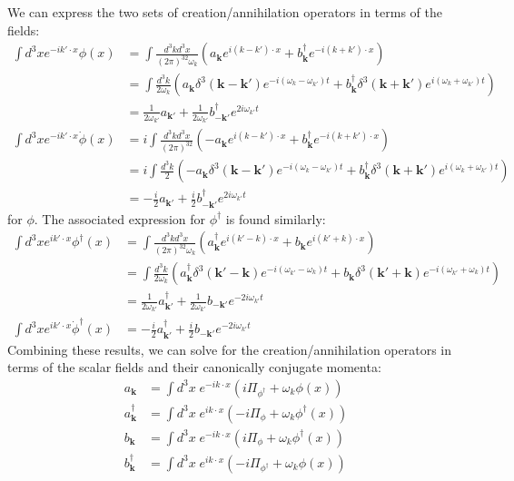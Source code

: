 \documentclass{mathnotes}
\begin{document}
We can express the two sets of creation/annihilation operators in terms of the fields:
\begin{align*}
    \int d^3x e^{-ik'\cdot x}\phi(x)&=\int \frac{d^3k d^3x}{(2\pi)^32\omega_k}\left( a_\mathbf{k}e^{i(k-k')\cdot x}+b^\dagger_\mathbf{k}e^{-i(k+k')\cdot x} \right)\\
    &=\int\frac{d^3k}{2\omega_k}\left( a_{\mathbf{k}}\delta^3(\mathbf{k}-\mathbf{k}')e^{-i(\omega_k-\omega_{k'})t}
    +b_\mathbf{k}^\dagger\delta^3(\mathbf{k}+\mathbf{k}')e^{i(\omega_k+\omega_{k'})t}\right)\\
    &=\frac{1}{2\omega_{k'}}a_{\mathbf{k}'}+\frac{1}{2\omega_{k'}}b^\dagger_{-\mathbf{k}'}e^{2i\omega_{k'}t}\\
    \int d^3x e^{-ik'\cdot x}\dot{\phi}(x)&=i\int \frac{d^3k d^3x}{(2\pi)^32}\left(-a_\mathbf{k}e^{i(k-k')\cdot x}+b^\dagger_\mathbf{k}e^{-i(k+k')\cdot x} \right)\\
    &=i\int\frac{d^3k}{2}\left(-a_{\mathbf{k}}\delta^3(\mathbf{k}-\mathbf{k}')e^{-i(\omega_k-\omega_{k'})t}
    +b_\mathbf{k}^\dagger\delta^3(\mathbf{k}+\mathbf{k}')e^{i(\omega_k+\omega_{k'})t}\right)\\
    &=-\frac{i}{2}a_{\mathbf{k}'}+\frac{i}{2}b^\dagger_{-\mathbf{k}'}e^{2i\omega_{k'}t}
\end{align*}
for $\phi$. The associated expression for $\phi^\dagger$ is found similarly:
\begin{align*}
    \int d^3x e^{ik'\cdot x}\phi^\dagger(x)&=\int \frac{d^3k d^3x}{(2\pi)^32\omega_k}\left( a^\dagger_\mathbf{k}e^{i(k'-k)\cdot x}+b_\mathbf{k}e^{i(k'+k)\cdot x} \right)\\
    &=\int\frac{d^3k}{2\omega_k}\left( a^\dagger_{\mathbf{k}}\delta^3(\mathbf{k}'-\mathbf{k})e^{-i(\omega_{k'}-\omega_{k})t}
    +b_\mathbf{k}\delta^3(\mathbf{k'}+\mathbf{k})e^{-i(\omega_{k'}+\omega_{k})t}\right)\\
    &=\frac{1}{2\omega_{k'}}a^\dagger_{\mathbf{k}'}+\frac{1}{2\omega_{k'}}b_{-\mathbf{k}'}e^{-2i\omega_{k'}t}\\
    \int d^3x e^{ik'\cdot x}\dot{\phi}^\dagger(x)&=-\frac{i}{2}a^\dagger_{\mathbf{k}'}+\frac{i}{2}b_{-\mathbf{k}'}e^{-2i\omega_{k'}t}
\end{align*}
Combining these results, we can solve for the creation/annihilation operators in terms of the scalar fields and their canonically conjugate momenta:
\begin{align*}
    a_{\mathbf{k}}&=\int d^3x\; e^{-ik\cdot x}\left( i\Pi_{\phi^\dagger}+\omega_k\phi(x) \right)\\
    a^\dagger_{\mathbf{k}}&=\int d^3x\; e^{ik\cdot x}\left( -i\Pi_{\phi}+\omega_k\phi^\dagger(x) \right)\\
    b_{\mathbf{k}}&=\int d^3x\; e^{-ik\cdot x}\left( i\Pi_{\phi} + \omega_k\phi^\dagger(x) \right)\\
    b_{\mathbf{k}}^\dagger&=\int d^3x\; e^{ik\cdot x}\left( -i\Pi_{\phi^\dagger} + \omega_k\phi(x) \right)
\end{align*}
\end{document}
